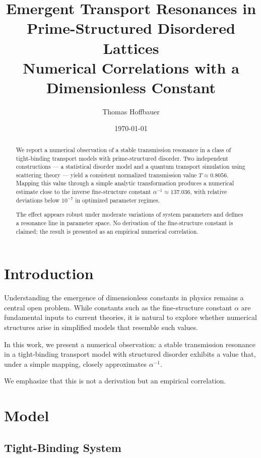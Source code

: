 \documentclass[11pt]{article}
\title{\textbf{Emergent Transport Resonances in Prime-Structured Disordered Lattices}\\
\large Numerical Correlations with a Dimensionless Constant}
\author{Thomas Hoffbauer}
\date{\today}
\begin{document}
\maketitle

\begin{abstract}
We report a numerical observation of a stable transmission resonance in a class of tight-binding transport models with prime-structured disorder. Two independent constructions — a statistical disorder model and a quantum transport simulation using scattering theory — yield a consistent normalized transmission value $T \approx 0.8056$. Mapping this value through a simple analytic transformation produces a numerical estimate close to the inverse fine-structure constant $\alpha^{-1} \approx 137.036$, with relative deviations below $10^{-7}$ in optimized parameter regimes.

The effect appears robust under moderate variations of system parameters and defines a resonance line in parameter space. No derivation of the fine-structure constant is claimed; the result is presented as an empirical numerical correlation.
\end{abstract}

\section{Introduction}

Understanding the emergence of dimensionless constants in physics remains a central open problem. While constants such as the fine-structure constant $\alpha$ are fundamental inputs to current theories, it is natural to explore whether numerical structures arise in simplified models that resemble such values.

In this work, we present a numerical observation: a stable transmission resonance in a tight-binding transport model with structured disorder exhibits a value that, under a simple mapping, closely approximates $\alpha^{-1}$.

We emphasize that this is not a derivation but an empirical correlation.

\section{Model}

\subsection{Tight-Binding System}
\end{document}
